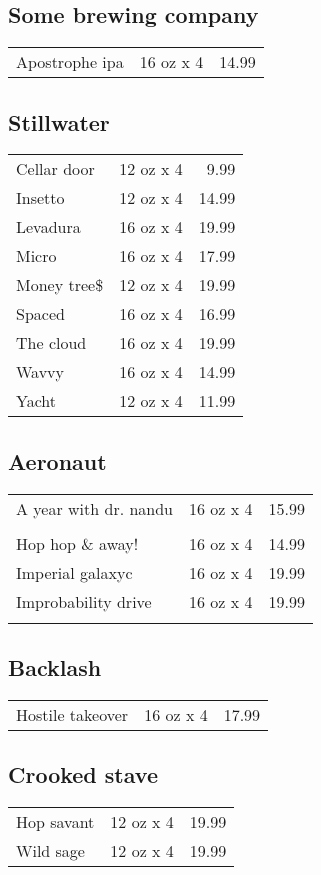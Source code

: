 \documentclass{article}%
\begin{document}
\begin{multicols}{3}
%
\subsection*{Some brewing company}%
\begin{tabular}{l c r}%
Apostrophe ipa&16 oz x 4&14.99\\%
\end{tabular}

%
\subsection*{Stillwater}%
\begin{tabular}{l c r}%
Cellar door&12 oz x 4&9.99\\%
Insetto&12 oz x 4&14.99\\%
Levadura&16 oz x 4&19.99\\%
Micro&16 oz x 4&17.99\\%
Money tree\$&12 oz x 4&19.99\\%
Spaced&16 oz x 4&16.99\\%
The cloud&16 oz x 4&19.99\\%
Wavvy&16 oz x 4&14.99\\%
Yacht&12 oz x 4&11.99\\%
\end{tabular}

%
\subsection*{Aeronaut}%
\begin{tabular}{l c r}%
\multirow{1}{15ex}{A year with dr. nandu}&16 oz x 4&15.99\\%
&&\\%
Hop hop \& away!&16 oz x 4&14.99\\%
Imperial galaxyc&16 oz x 4&19.99\\%
\multirow{1}{15ex}{Improbability drive}&16 oz x 4&19.99\\%
&&\\%
\end{tabular}

%
\subsection*{Backlash}%
\begin{tabular}{l c r}%
Hostile takeover&16 oz x 4&17.99\\%
\end{tabular}

%
\subsection*{Crooked stave}%
\begin{tabular}{l c r}%
Hop savant&12 oz x 4&19.99\\%
Wild sage&12 oz x 4&19.99\\%
\end{tabular}


\end{multicols}
\end{document}
